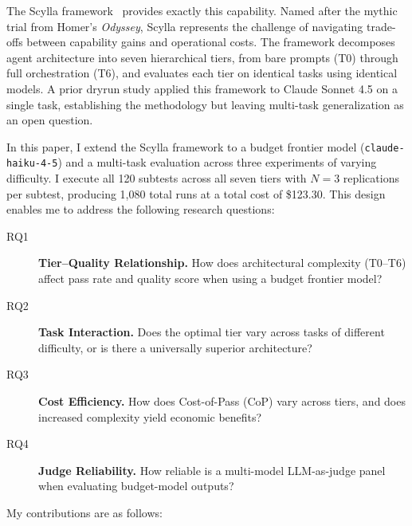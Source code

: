 \documentclass[11pt]{article}
\begin{document}
The Scylla framework~\cite{scylla2026dryrun} provides exactly this capability.
Named after the mythic trial from Homer's \emph{Odyssey}, Scylla represents
the challenge of navigating trade-offs between capability gains and operational
costs. The framework decomposes agent architecture into seven hierarchical
tiers, from bare prompts (T0) through full orchestration (T6), and evaluates
each tier on identical tasks using identical models. A prior dryrun study
applied this framework to Claude Sonnet 4.5 on a single task, establishing
the methodology but leaving multi-task generalization as an open question.

In this paper, I extend the Scylla framework to a budget frontier model
(\texttt{claude-haiku-4-5}) and a multi-task evaluation across three
experiments of varying difficulty. I execute all 120 subtests across all seven
tiers with $N=3$ replications per subtest, producing 1,080 total runs at a
total cost of \$123.30. This design enables me to address the following
research questions:

\begin{description}
  \item[RQ1] \textbf{Tier--Quality Relationship.} How does architectural
    complexity (T0--T6) affect pass rate and quality score when using a budget
    frontier model?
  \item[RQ2] \textbf{Task Interaction.} Does the optimal tier vary across
    tasks of different difficulty, or is there a universally superior
    architecture?
  \item[RQ3] \textbf{Cost Efficiency.} How does Cost-of-Pass (CoP) vary
    across tiers, and does increased complexity yield economic benefits?
  \item[RQ4] \textbf{Judge Reliability.} How reliable is a multi-model
    LLM-as-judge panel when evaluating budget-model outputs?
\end{description}

My contributions are as follows:
\end{document}
